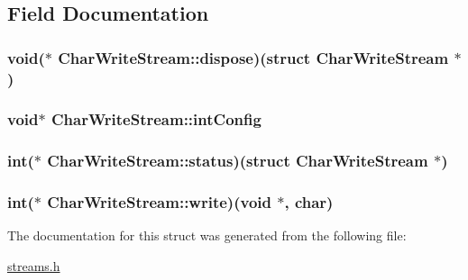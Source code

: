 \subsection{Field Documentation}
\hypertarget{structCharWriteStream_a9f4aad86a21d5bac116e691cce519953}{
\subsubsection[{dispose}]{\setlength{\rightskip}{0pt plus 5cm}void($\ast$ Char\+Write\+Stream\+::dispose)(struct {\bf Char\+Write\+Stream} $\ast$)}}\label{structCharWriteStream_a9f4aad86a21d5bac116e691cce519953}
\hypertarget{structCharWriteStream_acccc8e2084f5a9669fb92a5b4792a9ea}{
\subsubsection[{int\+Config}]{\setlength{\rightskip}{0pt plus 5cm}void$\ast$ Char\+Write\+Stream\+::int\+Config}}\label{structCharWriteStream_acccc8e2084f5a9669fb92a5b4792a9ea}
\hypertarget{structCharWriteStream_ab867de9b4464d9f6d5c5e49fda78a646}{
\subsubsection[{status}]{\setlength{\rightskip}{0pt plus 5cm}int($\ast$ Char\+Write\+Stream\+::status)(struct {\bf Char\+Write\+Stream} $\ast$)}}\label{structCharWriteStream_ab867de9b4464d9f6d5c5e49fda78a646}
\hypertarget{structCharWriteStream_a5bbd4a45a754eccf80bae5a6f16b215c}{
\subsubsection[{write}]{\setlength{\rightskip}{0pt plus 5cm}int($\ast$ Char\+Write\+Stream\+::write)(void $\ast$, char)}}\label{structCharWriteStream_a5bbd4a45a754eccf80bae5a6f16b215c}


The documentation for this struct was generated from the following file\+:\begin{DoxyCompactItemize}
\item 
\hyperlink{streams_8h}{streams.\+h}\end{DoxyCompactItemize}
